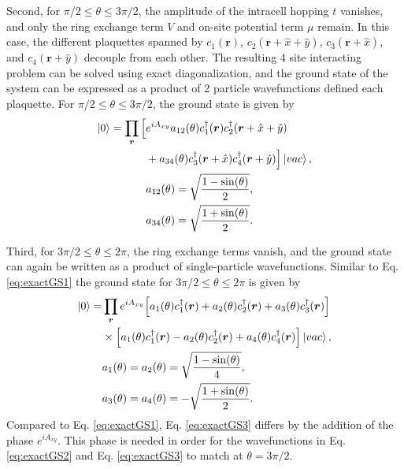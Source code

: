 \documentclass[prb,aps,twocolumn,groupaddress,floatfix]{revtex4-1}
\begin{document}
Second, for $\pi/2 \leq \theta \leq 3\pi/2$, the amplitude of the intracell hopping $t$ vanishes, and only the ring exchange term $V$ and on-site potential term $\mu$ remain. In this case, the different plaquettes spanned by $c_1(\bm{r})$, $c_2(\bm{r}+\hat{x}+\hat{y})$, $c_3(\bm{r}+\hat{x})$, and $c_4(\bm{r}+\hat{y})$ decouple from each other. The resulting 4 site interacting problem can be solved using exact diagonalization, and the ground state of the system can be expressed as a product of 2 particle wavefunctions defined each plaquette. For $\pi/2 \leq \theta \leq 3\pi/2$, the ground state is given by
\begin{equation}
\begin{split}
\ket{0} = \prod_{\bm{r}} \Big[& e^{iA_{xy}} a_{12}(\theta)c^\dagger_1(\bm{r})c^\dagger_2(\bm{r}
+\hat{x}+\hat{y})\\& + a_{34}(\theta) c^\dagger_3(\bm{r}+\hat{x})c^\dagger_4(\bm{r}+\hat{y})\Big]\ket{vac},\\
&a_{12}(\theta) = \sqrt{\frac{1-\sin(\theta)}{2}},\\
&a_{34}(\theta) = \sqrt{\frac{1+\sin(\theta)}{2}}.
\end{split}\label{eq:exactGS2}
\end{equation}

Third, for $3\pi/2 \leq \theta \leq 2\pi$, the ring exchange terms vanish, and the ground state can again be written as a product of single-particle wavefunctions. Similar to Eq. \ref{eq:exactGS1} the ground state for $3\pi/2 \leq \theta \leq 2\pi$ is given by 
\begin{equation}
\begin{split}
\ket{0} = &\prod_{\bm{r}} e^{iA_{xy}}\Big[a_1(\theta)c^\dagger_1(\bm{r}) + a_2(\theta)c^\dagger_2(\bm{r})+a_3(\theta)c^\dagger_3(\bm{r})\Big]\\ &\times \Big[a_1(\theta)c^\dagger_1(\bm{r}) - a_2(\theta)c^\dagger_2(\bm{r})+a_4(\theta)c^\dagger_4(\bm{r})\Big] \ket{vac},\\
&a_1(\theta) =a_2(\theta)= \sqrt{\frac{1-\sin(\theta)}{4}}, \\
&a_3(\theta) =a_4(\theta) = -\sqrt{\frac{1+\sin(\theta)}{2}}. 
\end{split}\label{eq:exactGS3}
\end{equation}
Compared to Eq. \ref{eq:exactGS1}, Eq. \ref{eq:exactGS3} differs by the addition of the phase $e^{iA_{xy}}$. This phase is needed in order for the wavefunctions in Eq. \ref{eq:exactGS2} and Eq. \ref{eq:exactGS3} to match at $\theta = 3\pi /2$. 
\end{document}
